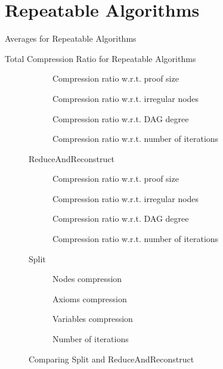 \section{Repeatable Algorithms}
\begin{table}[hbt]
  \centering
  \caption{Averages for Repeatable Algorithms}
\end{table}
\begin{table}[hbt]
  \centering
  \caption{Total Compression Ratio for Repeatable Algorithms}
\end{table}
\begin{figure}[hbt]
  \begin{subfigure}{\textwidth}
    \centering
    \caption{Compression ratio w.r.t. proof size}
  \end{subfigure}
  \begin{subfigure}{\textwidth}
    \centering
    \caption{Compression ratio w.r.t. irregular nodes}
  \end{subfigure}
  \begin{subfigure}{\textwidth}
    \centering
    \caption{Compression ratio w.r.t. DAG degree}
  \end{subfigure}
  \begin{subfigure}{\textwidth}
    \centering
    \caption{Compression ratio w.r.t. number of iterations}
  \end{subfigure}
  \caption{ReduceAndReconstruct}
\end{figure}
\begin{figure}[hbt]
  \begin{subfigure}{\textwidth}
    \centering
    \caption{Compression ratio w.r.t. proof size}
  \end{subfigure}
  \begin{subfigure}{\textwidth}
    \centering
    \caption{Compression ratio w.r.t. irregular nodes}
  \end{subfigure}
  \begin{subfigure}{\textwidth}
    \centering
    \caption{Compression ratio w.r.t. DAG degree}
  \end{subfigure}
  \begin{subfigure}{\textwidth}
    \centering
    \caption{Compression ratio w.r.t. number of iterations}
  \end{subfigure}
  \caption{Split}
\end{figure}
\begin{figure}[hbt]
  \begin{subfigure}{0.5\textwidth}
    \centering
    \caption{Nodes compression}
  \end{subfigure}
  \begin{subfigure}{0.5\textwidth}
    \centering
    \caption{Axioms compression}
  \end{subfigure}
  \begin{subfigure}{0.5\textwidth}
    \centering
    \caption{Variables compression}
  \end{subfigure}
  \begin{subfigure}{0.5\textwidth}
    \centering
    \caption{Number of iterations}
  \end{subfigure}
  \caption{Comparing Split and ReduceAndReconstruct}
\end{figure}
